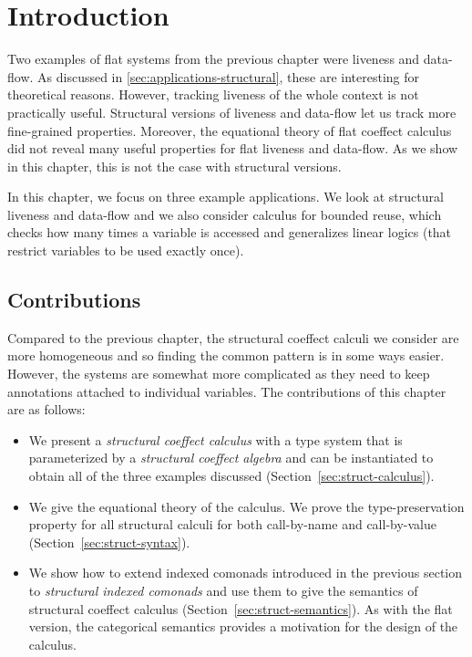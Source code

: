 \section{Introduction}
\label{sec:flat-intro}

Two examples of flat systems from the previous chapter were liveness and data-flow. As discussed
in \ref{sec:applications-structural}, these are interesting for theoretical reasons. However, tracking
liveness of the whole context is not practically useful. Structural versions of liveness and 
data-flow let us track more fine-grained properties. Moreover, the equational theory of flat 
coeffect calculus did not reveal many useful properties for flat liveness and data-flow. 
As we show in this chapter, this is not the case with structural versions.

In this chapter, we focus on three example applications. We look at structural liveness and
data-flow and we also consider calculus for bounded reuse, which checks how many times a variable
is accessed and generalizes linear logics (that restrict variables to be used exactly once).


\subsection{Contributions}

Compared to the previous chapter, the structural coeffect calculi we consider are more 
homogeneous and so finding the common pattern is in some ways easier. However, the systems
are somewhat more complicated as they need to keep annotations attached to individual variables. 
The contributions of this chapter are as follows:

\begin{itemize}
\item We present a \emph{structural coeffect calculus} with a type system that is parameterized by a 
  \emph{structural coeffect algebra} and can be instantiated to obtain all of the three examples
  discussed (Section~\ref{sec:struct-calculus}).
  
\item We give the equational theory of the calculus. We prove the type-preservation property 
  for all structural calculi for both call-by-name and call-by-value (Section~\ref{sec:struct-syntax}). 
  
\item We show how to extend indexed comonads introduced in the previous section to 
  \emph{structural indexed comonads} and use them to give the semantics of structural 
  coeffect calculus (Section~\ref{sec:struct-semantics}). As with the flat version, the
  categorical semantics provides a motivation for the design of the calculus.
\end{itemize}

